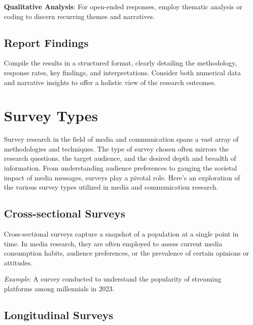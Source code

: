 \documentclass[
  b5paper]{book}
\begin{document}
\textbf{Qualitative Analysis}: For open-ended responses, employ thematic analysis or coding to discern recurring themes and narratives.

\hypertarget{report-findings}{%
\subsection*{Report Findings}\label{report-findings}}

Compile the results in a structured format, clearly detailing the methodology, response rates, key findings, and interpretations.
Consider both numerical data and narrative insights to offer a holistic view of the research outcomes.

\hypertarget{survey-types}{%
\section{Survey Types}\label{survey-types}}

Survey research in the field of media and communication spans a vast array of methodologies and techniques.
The type of survey chosen often mirrors the research questions, the target audience, and the desired depth and breadth of information.
From understanding audience preferences to gauging the societal impact of media messages, surveys play a pivotal role.
Here's an exploration of the various survey types utilized in media and communication research.

\hypertarget{cross-sectional-surveys}{%
\subsection*{Cross-sectional Surveys}\label{cross-sectional-surveys}}

Cross-sectional surveys capture a snapshot of a population at a single point in time.
In media research, they are often employed to assess current media consumption habits, audience preferences, or the prevalence of certain opinions or attitudes.

\emph{Example}: A survey conducted to understand the popularity of streaming platforms among millennials in 2023.

\hypertarget{longitudinal-surveys}{%
\subsection*{Longitudinal Surveys}\label{longitudinal-surveys}}
\end{document}
